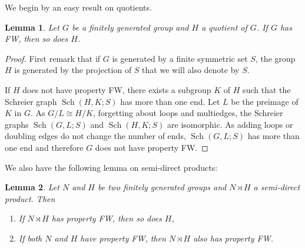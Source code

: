 \documentclass[a4paper]{article}
\newtheorem{lem}{Lemma}[section]
\theoremstyle{definition}
\theoremstyle{remark}
\DeclareMathOperator\Sch{Sch}
\begin{document}
We begin by an easy result on quotients.
\begin{lem}\label{Lem:Quotien}
Let $G$ be a finitely generated group and $H$ a quotient of $G$. If $G$ has FW, then so does $H$.
\end{lem}
%
\begin{proof}
First remark that if $G$ is generated by a finite symmetric set $S$, the group $H$ is generated by the projection of $S$ that we will also denote by $S$. 

If $H$ does not have property FW, there exists a subgroup $K$ of $H$ such that the Schreier graph $\Sch(H, K;S)$ has more than one end.
Let $L$ be the preimage of $K$ in $G$. As $G/L \cong H/K$, forgetting about loops and multiedges, the Schreier graphs $\Sch(G,L;S)$ and $\Sch(H,K;S)$ are isomorphic.
As adding loops or doubling edges do not change the number of ends, $\Sch(G,L;S)$ has more than one end and therefore $G$ does not have property FW.
\end{proof}
%
%
We also have the following lemma on semi-direct products:
%
%
\begin{lem}\label{Lemma:Semidirect_ends}
Let $N$ and $H$ be two finitely generated groups and $N\rtimes H$ a semi-direct product.
Then
\begin{enumerate}
\item If $N\rtimes H$ has property FW, then so does $H$,
\item If both $N$ and $H$ have property FW, then $N\rtimes H$ also has property FW.
\end{enumerate}
\end{lem}
%
%
\end{document}
